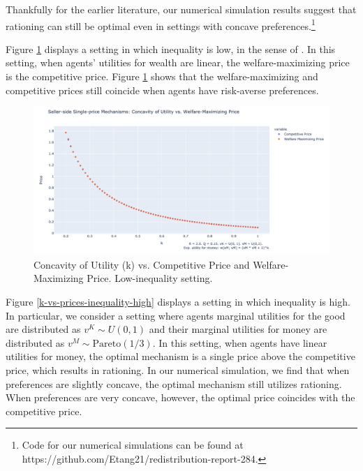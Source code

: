 \documentclass[AER]{AEA}
\begin{document}
Thankfully for the earlier literature, our numerical simulation results suggest that rationing can still be optimal even in settings with concave preferences.\footnote{Code for our numerical simulations can be found at https://github.com/Etang21/redistribution-report-284.}

Figure \ref{k-vs-prices-inequality-low} displays a setting in which inequality is low, in the sense of \cite{dworczak-2020}. In this setting, when agents' utilities for wealth are linear, the welfare-maximizing price is the competitive price. Figure \ref{k-vs-prices-inequality-low} shows that the welfare-maximizing and competitive prices still coincide when agents have risk-averse preferences.

\begin{figure}
    \label{k-vs-prices-inequality-low}
    \includegraphics[width=\textwidth]{figures/k-vs-prices-inequality-low.png}
    \caption{Concavity of Utility (k) vs. Competitive Price and Welfare-Maximizing Price. Low-inequality setting.}
\end{figure}

Figure \ref{k-vs-prices-inequality-high} displays a setting in which inequality is high. In particular, we consider a setting where agents marginal utilities for the good are distributed as $v^K \sim U(0,1)$ and their marginal utilities for money are distributed as $v^M \sim \textrm{Pareto}(1/3)$. In this setting, when agents have linear utilities for money, the optimal mechanism is a single price above the competitive price, which results in rationing. In our numerical simulation, we find that when preferences are slightly concave, the optimal mechanism still utilizes rationing. When preferences are very concave, however, the optimal price coincides with the competitive price.
\end{document}
